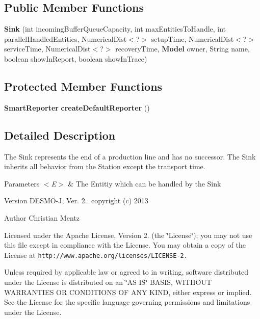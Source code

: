 \subsection*{Public Member Functions}
\begin{DoxyCompactItemize}
\item 
{\bf Sink} (int incoming\-Buffer\-Queue\-Capacity, int max\-Entities\-To\-Handle, int parallel\-Handled\-Entities, Numerical\-Dist$<$?$>$ setup\-Time, Numerical\-Dist$<$?$>$ service\-Time, Numerical\-Dist$<$?$>$ recovery\-Time, {\bf Model} owner, String name, boolean show\-In\-Report, boolean show\-In\-Trace)
\end{DoxyCompactItemize}
\subsection*{Protected Member Functions}
\begin{DoxyCompactItemize}
\item 
{\bf Smart\-Reporter} {\bfseries create\-Default\-Reporter} ()\label{classdesmoj_1_1extensions_1_1chaining_1_1_sink_3_01_e_01extends_01_entity_01_4_aab5f7baadf2184272255ee14a59f8091}

\end{DoxyCompactItemize}


\subsection{Detailed Description}
The Sink represents the end of a production line and has no successor. The Sink inherits all behavior from the Station except the transport time.


\begin{DoxyParams}{Parameters}
{\em $<$\-E$>$} & The Entitiy which can be handled by the Sink\\
\hline
\end{DoxyParams}
\begin{DoxyVersion}{Version}
D\-E\-S\-M\-O-\/\-J, Ver. 2.. copyright (c) 2013 
\end{DoxyVersion}
\begin{DoxyAuthor}{Author}
Christian Mentz
\end{DoxyAuthor}
Licensed under the Apache License, Version 2. (the \char`\"{}\-License\char`\"{}); you may not use this file except in compliance with the License. You may obtain a copy of the License at {\tt http\-://www.\-apache.\-org/licenses/\-L\-I\-C\-E\-N\-S\-E-\/2.}

Unless required by applicable law or agreed to in writing, software distributed under the License is distributed on an \char`\"{}\-A\-S I\-S\char`\"{} B\-A\-S\-I\-S, W\-I\-T\-H\-O\-U\-T W\-A\-R\-R\-A\-N\-T\-I\-E\-S O\-R C\-O\-N\-D\-I\-T\-I\-O\-N\-S O\-F A\-N\-Y K\-I\-N\-D, either express or implied. See the License for the specific language governing permissions and limitations under the License. 

